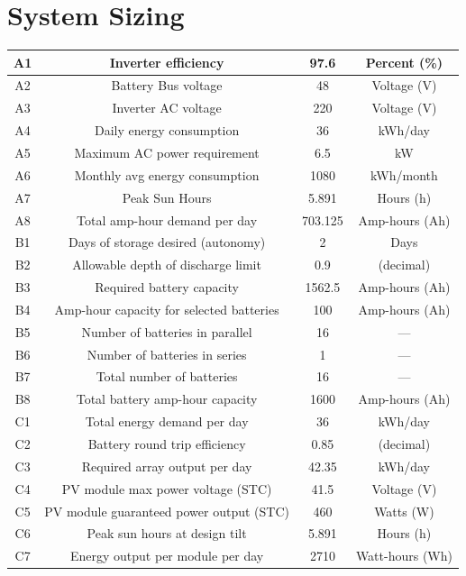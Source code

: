 \documentclass{article}
\begin{document}
\section{System Sizing}
\begin{table}[H]
\centering
\begin{tabular}{|c|c|c|c|}
\hline
A1 & Inverter efficiency & 97.6 & Percent (\%) \\
\hline
A2 & Battery Bus voltage & 48 & Voltage (V) \\
\hline
A3 & Inverter AC voltage & 220 & Voltage (V) \\
\hline
A4 & Daily energy consumption & 36 & kWh/day \\
\hline
A5 & Maximum AC power requirement & 6.5 & kW \\
\hline
A6 & Monthly avg energy consumption & 1080 & kWh/month \\
\hline
A7 & Peak Sun Hours & 5.891 & Hours (h) \\
\hline
A8 & Total amp-hour demand per day & 703.125 & Amp-hours (Ah) \\
\hline
B1 & Days of storage desired (autonomy) & 2 & Days \\
\hline
B2 & Allowable depth of discharge limit & 0.9 & (decimal) \\
\hline
B3 & Required battery capacity & 1562.5 & Amp-hours (Ah) \\
\hline
B4 & Amp-hour capacity for selected batteries & 100 & Amp-hours (Ah) \\
\hline
B5 & Number of batteries in parallel & 16 & --- \\
\hline
B6 & Number of batteries in series & 1 & --- \\
\hline
B7 & Total number of batteries & 16 & --- \\
\hline
B8 & Total battery amp-hour capacity & 1600 & Amp-hours (Ah) \\
\hline
C1 & Total energy demand per day & 36 & kWh/day \\
\hline
C2 & Battery round trip efficiency & 0.85 & (decimal) \\
\hline
C3 & Required array output per day & 42.35 & kWh/day \\
\hline
C4 & PV module max power voltage (STC) & 41.5 & Voltage (V) \\
\hline
C5 & PV module guaranteed power output (STC) & 460 & Watts (W) \\
\hline
C6 & Peak sun hours at design tilt & 5.891 & Hours (h) \\
\hline
C7 & Energy output per module per day & 2710 & Watt-hours (Wh) \\

\end{tabular}
\end{table}
\end{document}
